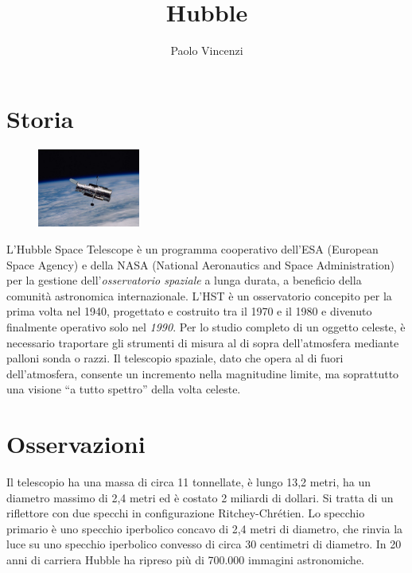 \documentclass[12pt,a4paper]{article}
\begin{document}
\title{\vspace{-70pt}Hubble}
\author{Paolo Vincenzi}
\date{}
\maketitle
\pagestyle{empty}
\thispagestyle{empty}

\section*{Storia}
\label{storia}
\begin{figure}
  \vspace{-10pt}
  \begin{center}
    \includegraphics[width=0.30\textwidth]{satellite}
  \end{center}
  \vspace{-20pt}
\end{figure}
L'Hubble Space Telescope è un programma cooperativo dell'ESA (European Space Agency) e della NASA (National Aeronautics and Space Administration) per la gestione dell'\emph{osservatorio spaziale} a lunga durata, a beneficio della comunità astronomica internazionale. L'HST è un osservatorio concepito per la prima volta nel 1940, progettato e costruito tra il 1970 e il 1980 e divenuto finalmente operativo solo nel \emph{1990}. 
Per lo studio completo di un oggetto celeste, è necessario traportare gli strumenti di misura al di sopra dell'atmosfera mediante palloni sonda o razzi.
Il telescopio spaziale, dato che opera al di fuori dell'atmosfera, consente un incremento nella magnitudine limite, ma soprattutto una visione ``a tutto spettro'' della volta celeste.

\section*{Osservazioni}
\label{osservazioni}

Il telescopio ha una massa di circa 11 tonnellate, è lungo 13,2 metri, ha un diametro massimo di 2,4 metri ed è costato 2 miliardi di dollari. Si tratta di un riflettore con due specchi in configurazione Ritchey-Chrétien. Lo specchio primario è uno specchio iperbolico concavo di 2,4 metri di diametro, che rinvia la luce su uno specchio iperbolico convesso di circa 30 centimetri di diametro. In 20 anni di carriera Hubble ha ripreso più di 700.000 immagini astronomiche.
\end{document}
